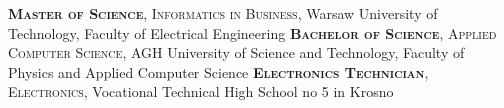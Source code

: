 

\begin{education}
					{\textbf{\textsc{Master of Science}}, \textsc{Informatics in Business}, Warsaw University of Technology,\hspace{9em} Faculty of Electrical Engineering}
					{\textbf{\textsc{Bachelor of Science}}, \textsc{Applied Computer Science}, AGH University of Science and Technology,\hspace{8em} Faculty of Physics and Applied Computer Science}
					{\textbf{\textsc{Electronics Technician}}, \textsc{Electronics}, Vocational Technical High School no 5 in Krosno}
\end{education}